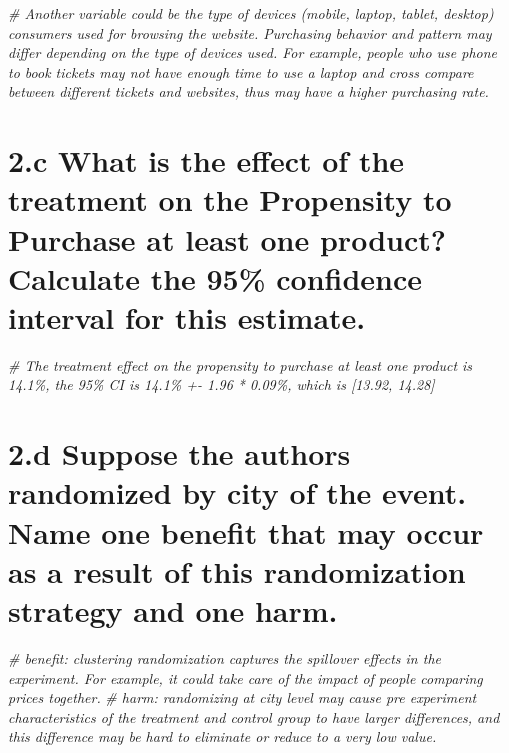 \documentclass[
]{article}
\newenvironment{Shaded}{\begin{snugshade}}{\end{snugshade}}
\newcommand{\CommentTok}[1]{\textcolor[rgb]{0.56,0.35,0.01}{\textit{#1}}}
\begin{document}
\begin{Shaded}
\begin{Highlighting}[]
\CommentTok{\# Another variable could be the type of devices (mobile, laptop, tablet, desktop) consumers used for browsing the website. Purchasing behavior and pattern may differ depending on the type of devices used. For example, people who use phone to book tickets may not have enough time to use a laptop and cross compare between different tickets and websites, thus may have a higher purchasing rate.}
\end{Highlighting}
\end{Shaded}

\hypertarget{c-what-is-the-effect-of-the-treatment-on-the-propensity-to-purchase-at-least-one-product-calculate-the-95-confidence-interval-for-this-estimate.}{%
\section{2.c What is the effect of the treatment on the Propensity to
Purchase at least one product? Calculate the 95\% confidence interval
for this
estimate.}\label{c-what-is-the-effect-of-the-treatment-on-the-propensity-to-purchase-at-least-one-product-calculate-the-95-confidence-interval-for-this-estimate.}}

\begin{Shaded}
\begin{Highlighting}[]
\CommentTok{\# The treatment effect on the propensity to purchase at least one product is 14.1\%, the 95\% CI is 14.1\% +{-} 1.96 * 0.09\%, which is [13.92, 14.28]}
\end{Highlighting}
\end{Shaded}

\hypertarget{d-suppose-the-authors-randomized-by-city-of-the-event.-name-one-benefit-that-may-occur-as-a-result-of-this-randomization-strategy-and-one-harm.}{%
\section{2.d Suppose the authors randomized by city of the event. Name
one benefit that may occur as a result of this randomization strategy
and one
harm.}\label{d-suppose-the-authors-randomized-by-city-of-the-event.-name-one-benefit-that-may-occur-as-a-result-of-this-randomization-strategy-and-one-harm.}}

\begin{Shaded}
\begin{Highlighting}[]
\CommentTok{\# benefit: clustering randomization captures the spillover effects in the experiment. For example, it could take care of the impact of people comparing prices together.}
\CommentTok{\# harm: randomizing at city level may cause pre experiment characteristics of the treatment and control group to have larger differences, and this difference may be hard to eliminate or reduce to a very low value.}
\end{Highlighting}
\end{Shaded}
\end{document}

